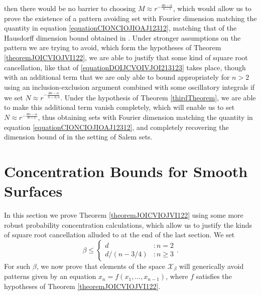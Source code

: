 \documentclass[dvipsnames,letterpaper,12pt]{article}
\numberwithin{equation}{section}
\numberwithin{theorem}{section}
\begin{document}
then there would be no barrier to choosing $M \approx r^{-\frac{dn-\alpha}{n-1}}$, which would allow us to prove the existence of a pattern avoiding set with Fourier dimension matching the quantity in equation \eqref{equationCIONCIOJIOAJ12312}, matching that of the Hausdorff dimension bound obtained in \cite{OurPaper}. Under stronger assumptions on the pattern we are trying to avoid, which form the hypotheses of Theorem \ref{theoremJOICVIOJVI122}, we are able to justify that some kind of square root cancellation, like that of \eqref{equationDOIJCVOIVJOI213123} takes place, though with an additional term that we are only able to bound appropriately for $n > 2$ using an inclusion-exclusion argument combined with some oscillatory integrals if we set $N \approx r^{-\frac{dn-\alpha}{n-3/4}}$. Under the hypothesis of Theorem \ref{thirdTheorem}, we are able to make this additional term vanish completely, which will enable us to set $N \approx r^{-\frac{dn - \alpha}{n - 1}}$, thus obtaining sets with Fourier dimension matching the quantity in equation \eqref{equationCIONCIOJIOAJ12312}, and completely recovering the dimension bound of \cite{OurPaper} in the setting of Salem sets.

\section{Concentration Bounds for Smooth Surfaces}

In this section we prove Theorem \ref{theoremJOICVIOJVI122} using some more robust probability concentration calculations, which allow us to justify the kinds of square root cancellation alluded to at the end of the last section. We set
%
\[ \beta \leq \begin{cases} d &: n = 2 \\ d/(n - 3/4) &: n \geq 3 \end{cases}. \]
%
For such $\beta$, we now prove that elements of the space $\mathcal{X}_\beta$ will generically avoid patterns given by an equation $x_n = f(x_1,\dots,x_{n-1})$, where $f$ satisfies the hypotheses of Theorem \ref{theoremJOICVIOJVI122}.
\end{document}
